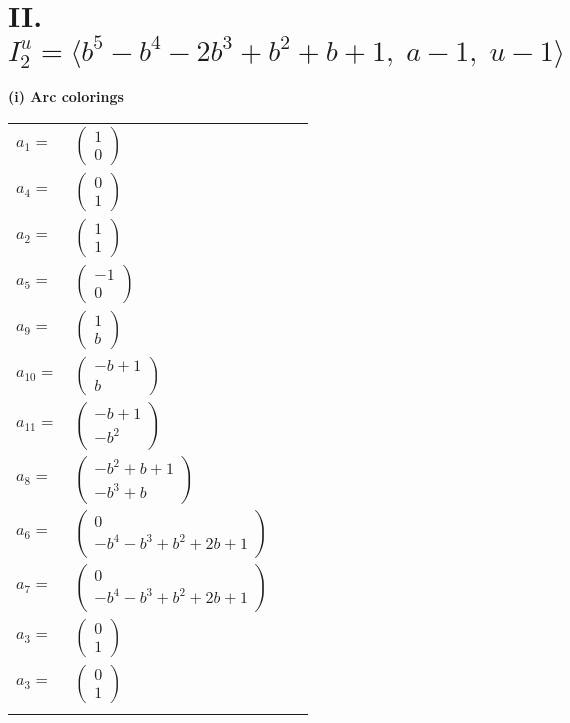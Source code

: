 \documentclass[1p]{elsarticle_modified}
\theoremstyle{definition}
\begin{document}
\centering \section*{II. $I^u_{2}= \langle b^5- b^4-2 b^3+b^2+b+1,\;a-1,\;u-1 \rangle$}
\flushleft \textbf{(i) Arc colorings}\\
\begin{tabular}{m{7pt} m{180pt} m{7pt} m{180pt} }
\flushright $a_{1}=$&$\begin{pmatrix}1\\0\end{pmatrix}$ \\
\flushright $a_{4}=$&$\begin{pmatrix}0\\1\end{pmatrix}$ \\
\flushright $a_{2}=$&$\begin{pmatrix}1\\1\end{pmatrix}$ \\
\flushright $a_{5}=$&$\begin{pmatrix}-1\\0\end{pmatrix}$ \\
\flushright $a_{9}=$&$\begin{pmatrix}1\\b\end{pmatrix}$ \\
\flushright $a_{10}=$&$\begin{pmatrix}- b+1\\b\end{pmatrix}$ \\
\flushright $a_{11}=$&$\begin{pmatrix}- b+1\\- b^2\end{pmatrix}$ \\
\flushright $a_{8}=$&$\begin{pmatrix}- b^2+b+1\\- b^3+b\end{pmatrix}$ \\
\flushright $a_{6}=$&$\begin{pmatrix}0\\- b^4- b^3+b^2+2 b+1\end{pmatrix}$ \\
\flushright $a_{7}=$&$\begin{pmatrix}0\\- b^4- b^3+b^2+2 b+1\end{pmatrix}$ \\
\flushright $a_{3}=$&$\begin{pmatrix}0\\1\end{pmatrix}$\\ \flushright $a_{3}=$&$\begin{pmatrix}0\\1\end{pmatrix}$\\&\end{tabular}
\end{document}
